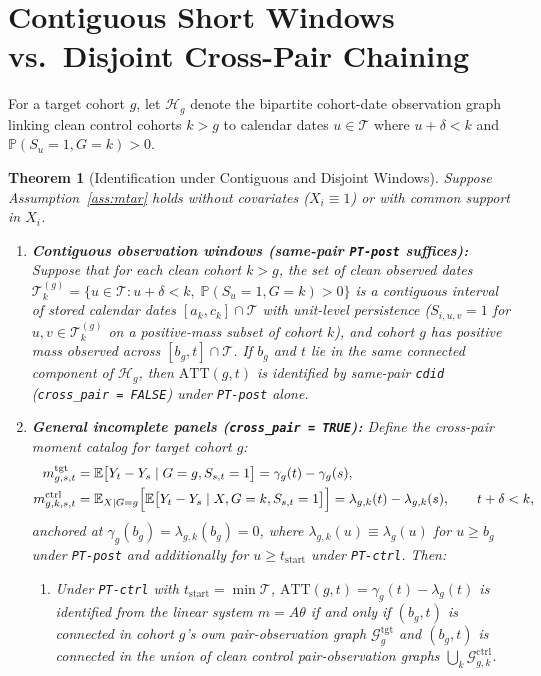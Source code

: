 \documentclass[11pt]{article}
\newtheorem{theorem}{Theorem}
\theoremstyle{definition}
\theoremstyle{remark}
\begin{document}
\section{Contiguous Short Windows vs.\ Disjoint Cross-Pair Chaining}

For a target cohort $g$, let $\mathcal{H}_g$ denote the bipartite cohort-date observation graph linking clean control cohorts $k > g$ to calendar dates $u \in \mathcal{T}$ where $u + \delta < k$ and $\mathbb{P}(S_u = 1, G = k) > 0$.

\begin{theorem}[Identification under Contiguous and Disjoint Windows]\label{thm:ident}
Suppose Assumption~\ref{ass:mtar} holds without covariates ($X_i \equiv 1$) or with common support in $X_i$.
\begin{enumerate}
\item[(a)] \textbf{Contiguous observation windows (same-pair \texttt{PT-post} suffices):} Suppose that for each clean cohort $k > g$, the set of clean observed dates $\mathcal{T}_k^{(g)} = \{u \in \mathcal{T} : u + \delta < k,\; \mathbb{P}(S_u=1, G=k)>0\}$ is a contiguous interval of stored calendar dates $[a_k, c_k] \cap \mathcal{T}$ with unit-level persistence ($S_{i,u,v}=1$ for $u,v \in \mathcal{T}_k^{(g)}$ on a positive-mass subset of cohort $k$), and cohort $g$ has positive mass observed across $[b_g, t] \cap \mathcal{T}$. If $b_g$ and $t$ lie in the same connected component of $\mathcal{H}_g$, then $\mathrm{ATT}(g,t)$ is identified by same-pair \texttt{cdid} (\texttt{cross\_pair = FALSE}) under \texttt{PT-post} alone.
\item[(b)] \textbf{General incomplete panels (\texttt{cross\_pair = TRUE}):} Define the cross-pair moment catalog for target cohort $g$:
\begin{align*}
m^{\mathrm{tgt}}_{g,s,t} &= \mathbb{E}\bigl[Y_t - Y_s \mid G=g, S_{s,t}=1\bigr] = \gamma_g(t) - \gamma_g(s), \\
m^{\mathrm{ctrl}}_{g,k,s,t} &= \mathbb{E}_{X \mid G=g}\Bigl[\mathbb{E}\bigl[Y_t - Y_s \mid X, G=k, S_{s,t}=1\bigr]\Bigr] = \lambda_{g,k}(t) - \lambda_{g,k}(s), \qquad t + \delta < k,
\end{align*}
anchored at $\gamma_g(b_g) = \lambda_{g,k}(b_g) = 0$, where $\lambda_{g,k}(u) \equiv \lambda_g(u)$ for $u \ge b_g$ under \texttt{PT-post} and additionally for $u \ge t_{\mathrm{start}}$ under \texttt{PT-ctrl}. Then:
\begin{enumerate}
\item[(i)] Under \texttt{PT-ctrl} with $t_{\mathrm{start}} = \min \mathcal{T}$, $\mathrm{ATT}(g,t) = \gamma_g(t) - \lambda_g(t)$ is identified from the linear system $m = A\theta$ if and only if $(b_g, t)$ is connected in cohort $g$'s own pair-observation graph $\mathcal{G}^{\mathrm{tgt}}_g$ and $(b_g, t)$ is connected in the union of clean control pair-observation graphs $\bigcup_{k} \mathcal{G}^{\mathrm{ctrl}}_{g,k}$.

\end{enumerate}
\end{enumerate}
\end{theorem}
\end{document}

